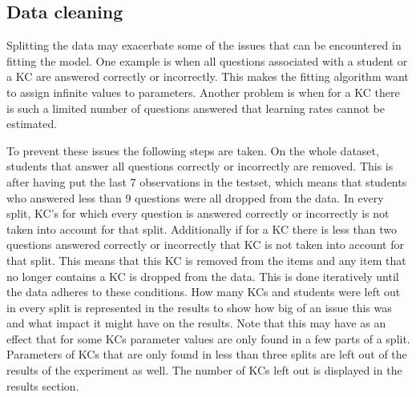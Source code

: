 \documentclass{scrartcl}
\newcommand\todo[1]{\textit{\textcolor{red}{#1}}}
\begin{document}

\subsection{Data cleaning}
\label{sec:cleaning}
Splitting the data may exacerbate some of the issues that can be encountered in fitting the model. One example is when all questions associated with a student or a KC are answered correctly or incorrectly. This makes the fitting algorithm want to assign infinite values to parameters. Another problem is when for a KC there is such a limited number of questions answered that learning rates cannot be estimated.

To prevent these issues the following steps are taken. On the whole dataset, students that answer all questions correctly or incorrectly are removed. This is after having put the last 7 observations in the testset, which means that students who answered less than 9 questions were all dropped from the data. 
In every split, KC's for which every question is answered correctly or incorrectly is not taken into account for that split. Additionally if for a KC there is less than two questions answered correctly or incorrectly that KC is not taken into account for that split. This means that this KC is removed from the items and any item that no longer contains a KC is dropped from the data. This is done iteratively until the data adheres to these conditions. How many KCs and students were left out in every split is represented in the results to show how big of an issue this was and what impact it might have on the results.
Note that this may have as an effect that for some KCs parameter values are only found in a few parts of a split. Parameters of KCs that are only found in less than three splits are left out of the results of the experiment as well. The number of KCs left out is displayed in the results section.
\end{document}
